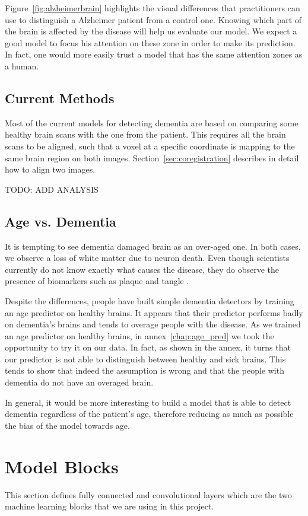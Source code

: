 Figure~\ref{fig:alzheimerbrain} highlights the visual differences that practitioners can use to distinguish a Alzheimer patient from a control one. Knowing which part of the brain is affected by the disease will help us evaluate our model. We expect a good model to focus his attention on these zone in order to make its prediction. In fact, one would more easily trust a model that has the same attention zones as a human.

\subsection{Current Methods}
Most of the current models for detecting dementia are based on comparing some healthy brain scans with the one from the patient. This requires all the brain scans to be aligned, such that a voxel at a specific coordinate is mapping to the same brain region on both images. Section~\ref{sec:coregistration} describes in detail how to align two images.

TODO: ADD ANALYSIS


\subsection{Age vs. Dementia}

It is tempting to see dementia damaged brain as an over-aged one. In both cases, we observe a loss of white matter due to neuron death. Even though scientists currently do not know exactly what causes the disease, they do observe the presence of biomarkers such as plaque and tangle \cite{alzheimer_past_present_future}.

Despite the differences, people have built simple dementia detectors by training an age predictor on healthy brains. It appears that their predictor performs badly on dementia's brains and tends to overage people with the disease. As we trained an age predictor on healthy brains, in annex~\ref{chap:age_pred} we took the opportunity to try it on our data. In fact, as shown in the annex, it turns that our predictor is not able to distinguish between healthy and sick brains. This tends to show that indeed the assumption is wrong and that the people with dementia do not have an overaged brain.

In general, it would be more interesting to build a model that is able to detect dementia regardless of the patient's age, therefore reducing as much as possible the bias of the model towards age.


\section{Model Blocks}
This section defines fully connected and convolutional layers which are the two machine learning blocks that we are using in this project.
